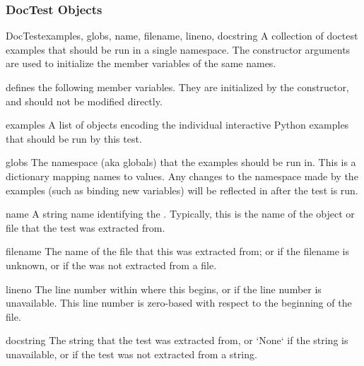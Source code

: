 \subsubsection{DocTest Objects\label{doctest-DocTest}}
\begin{classdesc}{DocTest}{examples, globs, name, filename, lineno,
                           docstring}
    A collection of doctest examples that should be run in a single
    namespace.  The constructor arguments are used to initialize the
    member variables of the same names.
\end{classdesc}

 defines the following member variables.  They are
initialized by the constructor, and should not be modified directly.

\begin{memberdesc}{examples}
    A list of  objects encoding the individual
    interactive Python examples that should be run by this test.
\end{memberdesc}

\begin{memberdesc}{globs}
    The namespace (aka globals) that the examples should be run in.
    This is a dictionary mapping names to values.  Any changes to the
    namespace made by the examples (such as binding new variables)
    will be reflected in  after the test is run.
\end{memberdesc}

\begin{memberdesc}{name}
    A string name identifying the .  Typically, this is
    the name of the object or file that the test was extracted from.
\end{memberdesc}

\begin{memberdesc}{filename}
    The name of the file that this  was extracted from;
    or  if the filename is unknown, or if the
     was not extracted from a file.
\end{memberdesc}

\begin{memberdesc}{lineno}
    The line number within  where this
     begins, or  if the line number is
    unavailable.  This line number is zero-based with respect to the
    beginning of the file.
\end{memberdesc}

\begin{memberdesc}{docstring}
    The string that the test was extracted from, or `None` if the
    string is unavailable, or if the test was not extracted from a
    string.
\end{memberdesc}


